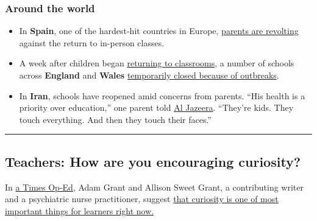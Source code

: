 \hypertarget{around-the-world}{%
\subsubsection{Around the world}\label{around-the-world}}

\begin{itemize}
\item
  In \textbf{Spain}, one of the hardest-hit countries in Europe,
  \href{https://apnews.com/c37b274675bbceb77fc1862f167795b9?utm_source=piano\&utm_medium=email\&utm_campaign=morningwire\&pnespid=h7Q0sfhdAVWNyzCvMpPvUY.UDcEZPg0zdWo0iKOj}{parents
  are revolting} against the return to in-person classes.
\item
  A week after children began
  \href{https://www.theguardian.com/education/2020/sep/01/joy-tears-and-coronavirus-controls-children-return-to-school-across-england-covid}{returning
  to classrooms}, a number of schools across \textbf{England} and
  \textbf{Wales}
  \href{https://www.theguardian.com/world/2020/sep/07/teachers-at-suffolk-school-test-positive-for-coronavirus}{temporarily
  closed because of outbreaks}.
\end{itemize}

\begin{itemize}
\tightlist
\item
  In \textbf{Iran}, schools have reopened amid concerns from parents.
  ``His health is a priority over education,'' one parent told
  \href{https://www.aljazeera.com/news/2020/09/iran-schools-reopen-government-seeks-reassure-concerned-parents-200905150540158.html}{Al
  Jazeera}. ``They're kids. They touch everything. And then they touch
  their faces.''
\end{itemize}

\begin{center}\rule{0.5\linewidth}{\linethickness}\end{center}

\hypertarget{teachers-how-are-you-encouraging-curiosity}{%
\subsection{Teachers: How are you encouraging
curiosity?}\label{teachers-how-are-you-encouraging-curiosity}}

In
\href{https://www.nytimes3xbfgragh.onion/2020/09/07/opinion/remote-school.html}{a
Times Op-Ed}, Adam Grant and Allison Sweet Grant, a contributing writer
and a psychiatric nurse practitioner, suggest
\href{https://www.nytimes3xbfgragh.onion/2020/09/07/opinion/remote-school.html}{that
curiosity is one of most important things for learners right now.}

